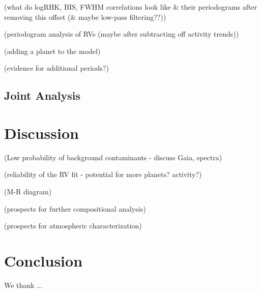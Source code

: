 \documentclass[modern]{aastex62}
\begin{document}
(what do logRHK, BIS, FWHM correlations look like \& their periodograms after removing this offset (\& maybe low-pass filtering??))

(periodogram analysis of RVs (maybe after subtracting off activity trends))

(adding a planet to the model)

(evidence for additional periods?)

\subsection{Joint Analysis}
\label{s:analysis:joint}


\section{Discussion}
\label{s:discussion}


(Low probability of background contaminants - discuss Gaia, spectra)

(reliability of the RV fit - potential for more planets? activity?)

(M-R diagram)

(prospects for further compositional analysis)

(prospects for atmospheric characterization)

\section{Conclusion}
\label{s:conclusion}


\acknowledgements
We thank ...





\end{document}

